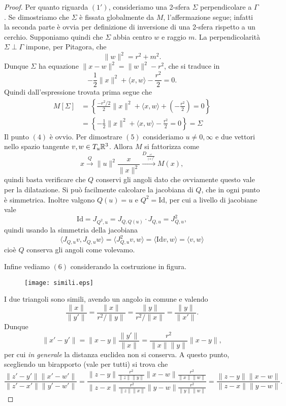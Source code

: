 \begin{proof}
	Per quanto riguarda $(1')$, consideriamo una 2-sfera $\Sigma$ perpendicolare a $\Gamma$. Se dimostriamo che $\Sigma$ è fissata globalmente da $M$, l'affermazione segue; infatti la seconda parte è ovvia per definizione di inversione di una 2-sfera rispetto a un cerchio. 
	Supponiamo quindi che $\Sigma$ abbia centro $w$ e raggio $m$. La perpendicolarità $\Sigma\perp\Gamma$ impone, per Pitagora, che $$\|w\|^{2} = r^{2} + m^{2}.$$
	Dunque $\Sigma$ ha equazione $\|x-w\|^{2} = \|w\|^{2}-r^{2}$, che si traduce in 
	$$-\frac{1}{2}\|x\|^{2} + \langle x, w\rangle - \frac{r^{2}}{2} = 0.$$
	Quindi dall'espressione trovata prima segue che 
	\begin{align*}
		M[\Sigma] &= 
		\left\{\frac{-r^{2}/2}{2}\|x\|^{2} + \langle x, w\rangle + \left(-\frac{r^{2}}{2}\right) =0\right\} \\ &=
		\left\{-\frac{1}{2}\|x\|^{2} + \langle x,w\rangle - \frac{r^{2}}{2} = 0\right\} = \Sigma
	\end{align*}
	Il punto $(4)$ è ovvio. Per dimostrare $(5)$ consideriamo $u\neq 0, \infty$ e due vettori nello spazio tangente $v,w\in T_{u}\mathbb{R}^{3}$. Allora $M$ si fattorizza come 
	$$x\xrightarrow[]{Q} \|u\|^{2}\frac{x}{\|x\|^{2}}\xrightarrow[]{D_{\frac{r^{2}}{\|u\|^{2}}}} M(x),$$
	quindi basta verificare che $Q$ conservi gli angoli dato che ovviamente questo vale per la dilatazione. 
	Si può facilmente calcolare la jacobiana di $Q$, che in ogni punto è simmetrica. Inoltre valgono $Q(u) = u$ e $Q^{2} = \text{Id}$, per cui a livello di jacobiane vale 
	$$\text{Id} = J_{Q^{2}, u} = J_{Q, Q(u)}\cdot J_{Q, u} = J_{Q,u}^{2},$$
	quindi usando la simmetria della jacobiana 
	$$\langle J_{Q,u}v, J_{Q,u}w\rangle = \langle J_{Q,u}^{2}v, w\rangle = \langle \text{Id}v, w\rangle = \langle v,w\rangle$$
	cioè $Q$ conserva gli angoli come volevamo.
	
	Infine vediamo $(6)$ considerando la costruzione in figura. 
	\begin{figure}[htbp]
	\begin{center}
	\texttt{[image: simili.eps]}
	\end{center}
	\end{figure}
	I due triangoli sono simili, avendo un angolo in comune e valendo 
	$$\frac{\|x\|}{\|y'\|} = \frac{\|x\|}{r^{2}/\|y\|} = \frac{\|y\|}{r^{2}/\|x\|} = \frac{\|y\|}{\|x'\|}.$$
	Dunque 
	$$\|x'-y'\| = \|x-y\| \frac{\|y'\|}{\|x\|} = \frac{r^{2}}{\|x\|\|y\|}\|x-y\|,$$
	per cui \emph{in generale} la distanza euclidea non si conserva.
	A questo punto, scegliendo un birapporto (vale per tutti) si trova che
	$$\frac{\|z'-y'\|\|x'-w'\|}{\|z'-x'\|\|y'-w'\|} = \frac{\|z-y\|\frac{r^{2}}{\|z\|\|y\|}\|x-w\|\frac{r^{2}}{\|x\|\|w\|}}{\|z-x\|\frac{r^{2}}{\|z\|\|x\|}\|y-w\|\frac{r^{2}}{\|y\|\|w\|}} = \frac{\|z-y\|\|x-w\|}{\|z-x\|\|y-w\|}.$$
\end{proof}

